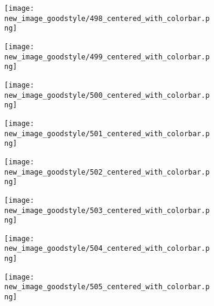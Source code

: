 \documentclass[a4paper,12pt]{article}
\begin{document}
\begin{figure}[H]
  \begin{subfigure}{0.11\textwidth}
    \texttt{[image: new\_image\_goodstyle/498\_centered\_with\_colorbar.png]}
  \end{subfigure}
  \hfill
  \begin{subfigure}{0.11\textwidth}
    \texttt{[image: new\_image\_goodstyle/499\_centered\_with\_colorbar.png]}
  \end{subfigure}
  \hfill
  \begin{subfigure}{0.11\textwidth}
    \texttt{[image: new\_image\_goodstyle/500\_centered\_with\_colorbar.png]}
  \end{subfigure}
  \hfill
  \begin{subfigure}{0.11\textwidth}
    \texttt{[image: new\_image\_goodstyle/501\_centered\_with\_colorbar.png]}
  \end{subfigure}
  \hfill
  \begin{subfigure}{0.11\textwidth}
    \texttt{[image: new\_image\_goodstyle/502\_centered\_with\_colorbar.png]}
  \end{subfigure}
  \hfill
  \begin{subfigure}{0.11\textwidth}
    \texttt{[image: new\_image\_goodstyle/503\_centered\_with\_colorbar.png]}
  \end{subfigure}
  \hfill
  \begin{subfigure}{0.11\textwidth}
    \texttt{[image: new\_image\_goodstyle/504\_centered\_with\_colorbar.png]}
  \end{subfigure}
  \hfill
  \begin{subfigure}{0.11\textwidth}
    \texttt{[image: new\_image\_goodstyle/505\_centered\_with\_colorbar.png]}
  \end{subfigure}
  \hfill
\end{figure}
\end{document}
